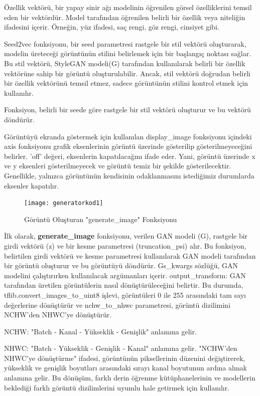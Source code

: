 \documentclass[12pt, a4paper]{article}
\begin{document}
	Özellik vektörü, bir yapay sinir ağı modelinin öğrenilen görsel özelliklerini temsil eden bir vektördür. Model tarafından öğrenilen belirli bir özellik veya niteliğin ifadesini içerir. Örneğin, yüz ifadesi, saç rengi, göz rengi, cinsiyet gibi.
	
	Seed2vec fonksiyonu, bir seed parametresi rastgele bir stil vektörü oluşturarak, modelin üreteceği görüntünün stilini belirlemek için bir başlangıç noktası sağlar. Bu stil vektörü, StyleGAN modeli(G) tarafından kullanılarak belirli bir özellik vektörüne sahip bir görüntü oluşturulabilir. Ancak, stil vektörü doğrudan belirli bir özellik vektörünü temsil etmez, sadece görüntünün stilini kontrol etmek için kullanılır.
	
	Fonksiyon, belirli bir seede göre rastgele bir stil vektörü oluşturur ve bu vektörü döndürür.
	
	Görüntüyü ekranda göstermek için kullanılan display\_image fonksiyonu içindeki axis fonksiyonu grafik eksenlerinin görüntü üzerinde gösterilip gösterilmeyeceğini belirler\cite{Matplotlibpyplot.axes-2024-04-17}. 'off' değeri, eksenlerin kapatılacağını ifade eder. Yani, görüntü üzerinde x ve y eksenleri gösterilmeyecek ve görüntü temiz bir şekilde gösterilecektir. Genellikle, yalnızca görüntünün kendisinin odaklanmasını istediğimiz durumlarda eksenler kapatılır.
	
	\begin{figure}[h]
		\centering
		\texttt{[image: generatorkod1]}
		\label{generatorkod1}
		\caption{Görüntü Oluşturan "generate\_image" Fonksiyonu}
	\end{figure}
	\FloatBarrier

	İlk olarak, \textbf{generate\_image} fonksiyonu, verilen GAN modeli (G), rastgele bir girdi vektörü (z) ve bir kesme parametresi (truncation\_psi) alır. Bu fonksiyon, belirtilen girdi vektörü ve kesme parametresi kullanılarak GAN modeli tarafından bir görüntü oluşturur ve bu görüntüyü döndürür.
	Gs\_kwargs sözlüğü, GAN modelini çalıştırırken kullanılacak argümanları içerir. 
	output\_transform: GAN tarafından üretilen görüntülerin nasıl dönüştürüleceğini belirtir. Bu durumda, tflib.convert\_images\_to\_uint8 işlevi, görüntüleri 0 ile 255 arasındaki tam sayı değerlerine dönüştürür ve nchw\_to\_nhwc parametresi, görüntü dizilimini NCHW'den NHWC'ye dönüştürür.
	
	NCHW: "Batch - Kanal - Yükseklik - Genişlik" anlamına gelir. 
	
	NHWC: "Batch - Yükseklik - Genişlik - Kanal" anlamına gelir\cite{NHWC-2024-04-18}.
	"NCHW'den NHWC'ye dönüştürme" ifadesi, görüntünün piksellerinin düzenini değiştirerek, yükseklik ve genişlik boyutları arasındaki sırayı kanal boyutunun ardına almak anlamına gelir. Bu dönüşüm, farklı derin öğrenme kütüphanelerinin ve modellerin beklediği farklı görüntü dizilimlerini uyumlu hale getirmek için kullanılır.
	
\end{document}
